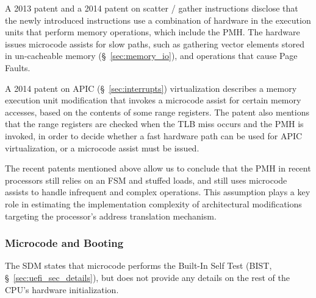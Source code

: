 A 2013 patent \cite{intel2013scattergather} and a 2014 patent
\cite{intel2014gather} on scatter / gather instructions disclose that the newly
introduced instructions use a combination of hardware in the execution units
that perform memory operations, which include the PMH. The hardware issues
microcode assists for slow paths, such as gathering vector elements stored in
un-cacheable memory (\S~\ref{sec:memory_io}), and operations that cause Page
Faults.


A 2014 patent on APIC (\S~\ref{sec:interrupts}) virtualization
\cite{intel2014vapic} describes a memory execution unit modification that
invokes a microcode assist for certain memory accesses, based on the contents
of some range registers. The patent also mentions that the range registers are
checked when the TLB miss occurs and the PMH is invoked, in order to decide
whether a fast hardware path can be used for APIC virtualization, or a
microcode assist must be issued.

The recent patents mentioned above allow us to conclude that the PMH in recent
processors still relies on an FSM and stuffed loads, and still uses microcode
assists to handle infrequent and complex operations. This assumption plays a
key role in estimating the implementation complexity of architectural
modifications targeting the processor's address translation mechanism.


\subsubsection{Microcode and Booting}
\label{sec:microcode_sec}

The SDM states that microcode performs the Built-In Self Test (BIST,
\S~\ref{sec:uefi_sec_details}), but does not provide any details on the
rest of the CPU's hardware initialization.



